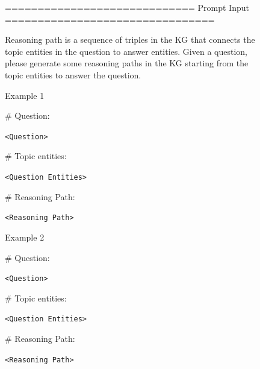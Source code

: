 \begin{figure}[h]
    \centering
    \begin{minipage}{0.99\columnwidth}
        \centering
        \begin{tcolorbox}[title=Few-shot Graph-constrained Decoding Prompt]
            \small
            ============================= Prompt Input ================================
    
            Reasoning path is a sequence of triples in the KG that connects the topic entities in the question to answer entities. Given a question, please generate some reasoning paths in the KG starting from the topic entities to answer the question.
    
            \vspace{10pt}

            Example 1

            \vspace{10pt}

            \# Question: 
            
            \texttt{<Question>}

            \vspace{10pt}

            \# Topic entities:

            \texttt{<Question Entities>}

            \vspace{10pt}

            \# Reasoning Path: 
            
            \texttt{<Reasoning Path>}

            \vspace{10pt}

            Example 2

            \vspace{10pt}

            \# Question: 
            
            \texttt{<Question>}

            \vspace{10pt}

            \# Topic entities:

            \texttt{<Question Entities>}

            \vspace{10pt}
            
            \# Reasoning Path: 
            
            \texttt{<Reasoning Path>}


\end{tcolorbox}
\end{minipage}
\end{figure}
